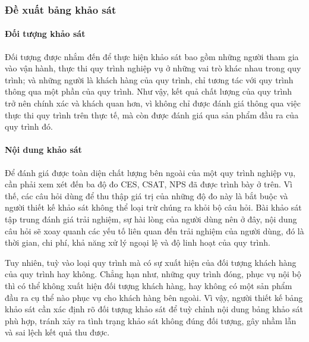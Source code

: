 \subsubsection{Đề xuất bảng khảo sát}
\paragraph{Đối tượng khảo sát}\mbox{}

Đối tượng được nhắm đến để thực hiện khảo sát bao gồm những người tham gia vào vận hành, thực thi quy trình nghiệp vụ ở những vai trò khác nhau trong quy trình; và những người là khách hàng của quy trình, chỉ tương tác với quy trình thông qua một phần của quy trình. Như vậy, kết quả chất lượng của quy trình trở nên chính xác và khách quan hơn, vì không chỉ được đánh giá thông qua việc thực thi quy trình trên thực tế, mà còn được đánh giá qua sản phẩm đầu ra của quy trình đó.
\paragraph{Nội dung khảo sát}\mbox{}

Để đánh giá được toàn diện chất lượng bên ngoài của một quy trình nghiệp vụ, cần phải xem xét đến ba độ đo CES, CSAT, NPS đã được trình bày ở trên. Vì thế, các câu hỏi dùng để thu thập giá trị của những độ đo này là bắt buộc và người thiết kế khảo sát không thể loại trừ chúng ra khỏi bộ câu hỏi. Bài khảo sát tập trung đánh giá trải nghiệm, sự hài lòng của người dùng nên ở đây, nội dung câu hỏi sẽ xoay quanh các yếu tố liên quan đến trải nghiệm của người dùng, đó là thời gian, chi phí, khả năng xử lý ngoại lệ và độ linh hoạt của quy trình.

\par
Tuy nhiên, tuỳ vào loại quy trình mà có sự xuất hiện của đối tượng khách hàng của quy trình hay không. Chẳng hạn như, những quy trình đóng, phục vụ nội bộ thì có thể không xuất hiện đối tượng khách hàng, hay không có một sản phẩm đầu ra cụ thể nào phục vụ cho khách hàng bên ngoài. Vì vậy, người thiết kế bảng khảo sát cần xác định rõ đối tượng khảo sát để tuỳ chỉnh nội dung bảng khảo sát phù hợp, tránh xảy ra tình trạng khảo sát không đúng đối tượng, gây nhầm lẫn và sai lệch kết quả thu được.

